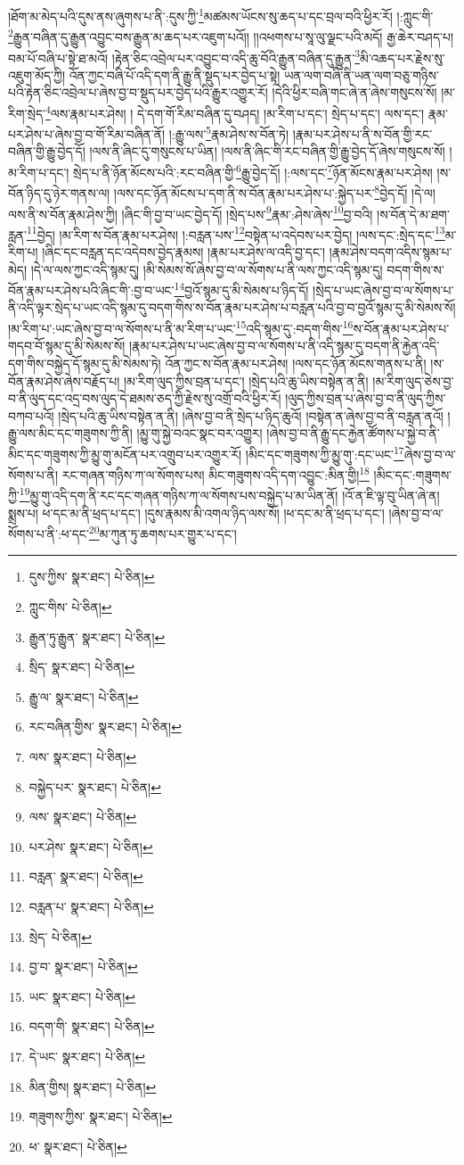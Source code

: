 །ཐོག་མ་མེད་པའི་དུས་ནས་ཞུགས་པ་ནི་:དུས་ཀྱི་\footnote{དུས་ཀྱིས་  སྣར་ཐང་།  པེ་ཅིན། }མཚམས་ཡོངས་སུ་ཆད་པ་དང་བྲལ་བའི་ཕྱིར་རོ། །:ཀླུང་གི་\footnote{ཀླུང་གིས་  པེ་ཅིན། }རྒྱུན་བཞིན་དུ་རྒྱུན་འབྱུང་བས་རྒྱུན་མ་ཆད་པར་འཇུག་པའོ།། །།འཕགས་པ་སཱ་ལུ་ལྗང་པའི་མདོ། རྒྱ་ཆེར་བཤད་པ། བམ་པོ་བཞི་པ་སྟེ་ཐ་མའོ། །རྟེན་ཅིང་འབྲེལ་པར་འབྱུང་བ་འདི་ཆུ་བོའི་རྒྱུན་བཞིན་དུ་རྒྱུན་\footnote{རྒྱུན་ཏུ་རྒྱུན་  སྣར་ཐང་།  པེ་ཅིན། }མི་འཆད་པར་རྗེས་སུ་འཇུག་མོད་ཀྱི། འོན་ཀྱང་བཞི་པོ་འདི་དག་ནི་རྒྱུ་ནི་སྡུད་པར་བྱེད་པ་སྟེ། ཡན་ལག་བཞི་ནི་ཡན་ལག་བཅུ་གཉིས་པའི་རྟེན་ཅིང་འབྲེལ་པ་ཞེས་བྱ་བ་སྡུད་པར་བྱེད་པའི་རྒྱུར་འགྱུར་རོ། །དེའི་ཕྱིར་བཞི་གང་ཞེ་ན་ཞེས་གསུངས་སོ། །མ་རིག་སྲེད་\footnote{སྲིད་  སྣར་ཐང་།  པེ་ཅིན། }ལས་རྣམ་པར་ཤེས། །
དེ་དག་གོ་རིམ་བཞིན་དུ་བཤད། །མ་རིག་པ་དང་། སྲེད་པ་དང་། ལས་དང་། རྣམ་པར་ཤེས་པ་ཞེས་བྱ་བ་གོ་རིམ་བཞིན་ནོ། །:རྒྱུ་ལས་\footnote{རྒྱུ་ལ་  སྣར་ཐང་།  པེ་ཅིན། }རྣམ་ཤེས་ས་བོན་ཏེ། །རྣམ་པར་ཤེས་པ་ནི་ས་བོན་གྱི་རང་བཞིན་གྱི་རྒྱུ་བྱེད་དོ། །ལས་ནི་ཞིང་དུ་གསུངས་པ་ཡིན། །ལས་ནི་ཞིང་གི་རང་བཞིན་གྱི་རྒྱུ་བྱེད་དོ་ཞེས་གསུངས་སོ། །མ་རིག་པ་དང་། སྲེད་པ་ནི་ཉོན་མོངས་པའི་:རང་བཞིན་གྱི་\footnote{རང་བཞིན་གྱིས་  སྣར་ཐང་།  པེ་ཅིན། }རྒྱུ་བྱེད་དོ། །:ལས་དང་\footnote{ལས་  སྣར་ཐང་།  པེ་ཅིན། }ཉོན་མོངས་རྣམ་པར་ཤེས། །ས་བོན་ཉིད་དུ་ཉེར་གནས་ལ། །ལས་དང་ཉོན་མོངས་པ་དག་ནི་ས་བོན་རྣམ་པར་ཤེས་པ་:སྐྱེད་པར་\footnote{བསྐྱེད་པར་  སྣར་ཐང་།  པེ་ཅིན། }བྱེད་དོ། །དེ་ལ། ལས་ནི་ས་བོན་རྣམ་ཤེས་ཀྱི། །ཞིང་གི་བྱ་བ་ཡང་བྱེད་དོ། །སྲེད་པས་\footnote{ལས་  སྣར་ཐང་།  པེ་ཅིན། }རྣམ་:ཤེས་ཞེས་\footnote{པར་ཤེས་  སྣར་ཐང་།  པེ་ཅིན། }བྱ་བའི། །ས་བོན་དེ་མ་ཐག་རླན་\footnote{བརླན་  སྣར་ཐང་།  པེ་ཅིན། }བྱེད། །མ་རིག་ས་བོན་རྣམ་པར་ཤེས། །:བརླན་པས་\footnote{བརླན་པ་  སྣར་ཐང་།  པེ་ཅིན། }བསྟེན་པ་འདེབས་པར་བྱེད། །ལས་དང་:སྲེད་དང་\footnote{སྲེད་  པེ་ཅིན། }མ་རིག་པ། །ཞིང་དང་བརླན་དང་འདེབས་བྱེད་རྣམས། །རྣམ་པར་ཤེས་ལ་འདི་བྱ་དང་། །རྣམ་ཤེས་བདག་འདིས་སྙམ་པ་མེད། །དེ་ལ་ལས་ཀྱང་འདི་སྙམ་དུ། །མི་སེམས་སོ་ཞེས་བྱ་བ་ལ་སོགས་པ་ནི་ལས་ཀྱང་འདི་སྙམ་དུ། བདག་གིས་ས་བོན་རྣམ་པར་ཤེས་པའི་ཞིང་གི་:བྱ་བ་ཡང་\footnote{བྱ་བ་  སྣར་ཐང་།  པེ་ཅིན། }བྱའོ་སྙམ་དུ་མི་སེམས་པ་ཉིད་དོ། །སྲེད་པ་ཡང་ཞེས་བྱ་བ་ལ་སོགས་པ་ནི་འདི་ལྟར་སྲེད་པ་ཡང་འདི་སྙམ་དུ་བདག་གིས་ས་བོན་རྣམ་པར་ཤེས་པ་བརླན་པའི་བྱ་བ་བྱའོ་སྙམ་དུ་མི་སེམས་སོ། །མ་རིག་པ་:ཡང་ཞེས་བྱ་བ་ལ་སོགས་པ་ནི་མ་རིག་པ་ཡང་\footnote{ཡང་  སྣར་ཐང་།  པེ་ཅིན། }འདི་སྙམ་དུ་:བདག་གིས་\footnote{བདག་གི་  སྣར་ཐང་།  པེ་ཅིན། }ས་བོན་རྣམ་པར་ཤེས་པ་གདབ་བོ་སྙམ་དུ་མི་སེམས་སོ། །རྣམ་པར་ཤེས་པ་ཡང་ཞེས་བྱ་བ་ལ་སོགས་པ་ནི་འདི་སྙམ་དུ་བདག་ནི་རྐྱེན་འདི་དག་གིས་བསྐྱེད་དོ་སྙམ་དུ་མི་སེམས་ཏེ། འོན་ཀྱང་ས་བོན་རྣམ་པར་ཤེས། །ལས་དང་ཉོན་མོངས་གནས་པ་ནི། །ས་བོན་རྣམ་ཤེས་ཞེས་བརྗོད་པ། །མ་རིག་ལུད་ཀྱིས་བྲན་པ་དང་། །སྲེད་པའི་ཆུ་ཡིས་བསྟེན་ན་ནི། །མ་རིག་ལུད་ཅེས་བྱ་བ་ནི་ལུད་དང་འདྲ་བས་ལུད་དེ་ཐམས་ཅད་ཀྱི་རྗེས་སུ་འགྲོ་བའི་ཕྱིར་རོ། །ལུད་ཀྱིས་བྲན་པ་ཞེས་བྱ་བ་ནི་ལུད་ཀྱིས་བཀབ་པའོ། །སྲེད་པའི་ཆུ་ཡིས་བསྟེན་ན་ནི། །ཞེས་བྱ་བ་ནི་སྲེད་པ་ཉིད་ཆུའོ། །བསྟེན་ན་ཞེས་བྱ་བ་ནི་བརླན་ནའོ། །རྒྱུ་ལས་མིང་དང་གཟུགས་ཀྱི་ནི། །མྱུ་གུ་སྐྱེ་བའང་སྣང་བར་འགྱུར། །ཞེས་བྱ་བ་ནི་རྒྱུ་དང་རྐྱེན་ཚོགས་པ་སྐྱེ་བ་ནི་མིང་དང་གཟུགས་ཀྱི་མྱུ་གུ་མངོན་པར་འགྲུབ་པར་འགྱུར་རོ། །མིང་དང་གཟུགས་ཀྱི་མྱུ་གུ་:དང་ཡང་\footnote{དེ་ཡང་  སྣར་ཐང་།  པེ་ཅིན། }ཞེས་བྱ་བ་ལ་སོགས་པ་ནི། རང་གཞན་གཉིས་ཀ་ལ་སོགས་པས། མིང་གཟུགས་འདི་དག་འབྱུང་:མིན་གྱི།\footnote{མིན་གྱིས།  སྣར་ཐང་།  པེ་ཅིན། } །མིང་དང་:གཟུགས་ཀྱི་\footnote{གཟུགས་ཀྱིས་  སྣར་ཐང་།  པེ་ཅིན། }མྱུ་གུ་འདི་དག་ནི་རང་དང་གཞན་གཉིས་ཀ་ལ་སོགས་པས་བསྐྱེད་པ་མ་ཡིན་ནོ། །འོ་ན་ཇི་ལྟ་བུ་ཡིན་ཞེ་ན། སྨྲས་པ། ཕ་དང་མ་ནི་ཕྲད་པ་དང་། །དུས་རྣམས་མི་འགལ་ཉིད་ལས་སོ། །ཕ་དང་མ་ནི་ཕྲད་པ་དང་། །ཞེས་བྱ་བ་ལ་སོགས་པ་ནི་:ཕ་དང་\footnote{ཕ་  སྣར་ཐང་།  པེ་ཅིན། }མ་ཀུན་ཏུ་ཆགས་པར་གྱུར་པ་དང་། 